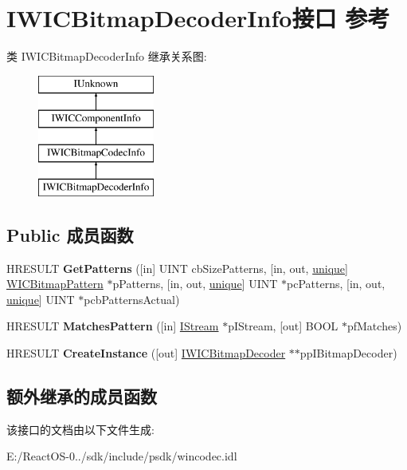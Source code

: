 \hypertarget{interface_i_w_i_c_bitmap_decoder_info}{}\section{I\+W\+I\+C\+Bitmap\+Decoder\+Info接口 参考}
\label{interface_i_w_i_c_bitmap_decoder_info}
类 I\+W\+I\+C\+Bitmap\+Decoder\+Info 继承关系图\+:\begin{figure}[H]
\begin{center}
\leavevmode
\includegraphics[height=4.000000cm]{interface_i_w_i_c_bitmap_decoder_info}
\end{center}
\end{figure}
\subsection*{Public 成员函数}
\begin{DoxyCompactItemize}
\item 
\mbox{\label{interface_i_w_i_c_bitmap_decoder_info_a01d6c147e6d95d125778eeae94777079}} 
H\+R\+E\+S\+U\+LT {\bfseries Get\+Patterns} (\mbox{[}in\mbox{]} U\+I\+NT cb\+Size\+Patterns, \mbox{[}in, out, \hyperlink{interfaceunique}{unique}\mbox{]} \hyperlink{struct_w_i_c_bitmap_pattern}{W\+I\+C\+Bitmap\+Pattern} $\ast$p\+Patterns, \mbox{[}in, out, \hyperlink{interfaceunique}{unique}\mbox{]} U\+I\+NT $\ast$pc\+Patterns, \mbox{[}in, out, \hyperlink{interfaceunique}{unique}\mbox{]} U\+I\+NT $\ast$pcb\+Patterns\+Actual)
\item 
\mbox{\label{interface_i_w_i_c_bitmap_decoder_info_ae63c4deda651412e8b7e962be8e509d5}} 
H\+R\+E\+S\+U\+LT {\bfseries Matches\+Pattern} (\mbox{[}in\mbox{]} \hyperlink{interface_i_stream}{I\+Stream} $\ast$p\+I\+Stream, \mbox{[}out\mbox{]} B\+O\+OL $\ast$pf\+Matches)
\item 
\mbox{\label{interface_i_w_i_c_bitmap_decoder_info_ad9a1d7c9319b0654b705ac4cab51a793}} 
H\+R\+E\+S\+U\+LT {\bfseries Create\+Instance} (\mbox{[}out\mbox{]} \hyperlink{interface_i_w_i_c_bitmap_decoder}{I\+W\+I\+C\+Bitmap\+Decoder} $\ast$$\ast$pp\+I\+Bitmap\+Decoder)
\end{DoxyCompactItemize}
\subsection*{额外继承的成员函数}


该接口的文档由以下文件生成\+:\begin{DoxyCompactItemize}
\item 
E\+:/\+React\+O\+S-\/0../sdk/include/psdk/wincodec.\+idl\end{DoxyCompactItemize}
